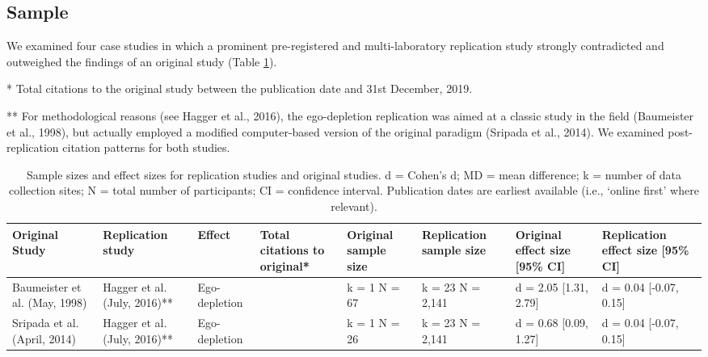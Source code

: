 \documentclass[
  american,
  ,man,floatsintext]{apa6}
\begin{document}
\hypertarget{sample}{%
\subsection{Sample}\label{sample}}

We examined four case studies in which a prominent pre-registered and multi-laboratory replication study strongly contradicted and outweighed the findings of an original study (Table \ref{tab:studyDetails}).

\begingroup\fontsize{10}{12}\selectfont

\begin{ThreePartTable}
\begin{TableNotes}[para]
\item[*] Total citations to the original study between the publication date and 31st December, 2019.
\item[**] For methodological reasons (see Hagger et al., 2016), the ego-depletion replication was aimed at a classic study in the field (Baumeister et al., 1998), but actually employed a modified computer-based version of the original paradigm (Sripada et al., 2014). We examined post-replication citation patterns for both studies.
\end{TableNotes}
\begin{longtable}[t]{>{\raggedright\arraybackslash}p{1.8cm}>{\raggedright\arraybackslash}p{1.8cm}>{\raggedright\arraybackslash}p{1.5cm}>{\raggedright\arraybackslash}p{1.5cm}>{\raggedright\arraybackslash}p{1.5cm}>{\raggedright\arraybackslash}p{1.5cm}>{\raggedright\arraybackslash}p{1.8cm}>{\raggedright\arraybackslash}p{1.8cm}}
\caption{\label{tab:studyDetails}Sample sizes and effect sizes for replication studies and original studies. d = Cohen’s d; MD = mean difference; k = number of data collection sites; N = total number of participants; CI = confidence interval. Publication dates are earliest available (i.e., ‘online first’ where relevant).}\\
\toprule
Original Study & Replication study & Effect & Total citations to original* & Original sample size & Replication sample size & Original effect size [95\% CI] & Replication effect size [95\% CI]\\
\midrule
Baumeister et al. (May, 1998) & Hagger et al. (July, 2016)** & Ego-depletion & 1974 & k = 1 N = 67 & k = 23 N = 2,141 & d = 2.05 [1.31, 2.79] & d = 0.04 [-0.07, 0.15]\\
Sripada et al. (April, 2014) & Hagger et al. (July, 2016)** & Ego-depletion & 36 & k = 1 N = 26 & k = 23 N = 2,141 & d = 0.68 [0.09, 1.27] & d = 0.04 [-0.07, 0.15]\\

\end{longtable}
\end{ThreePartTable}
\end{document}
